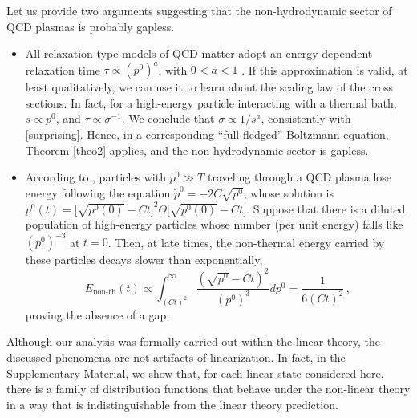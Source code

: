 \documentclass[a4paper, amsfonts, amssymb, amsmath, reprint, showkeys, nofootinbib, twoside, onecolumn,notitlepage,,longbibliography]{revtex4-2}
\theoremstyle{definition}
\theoremstyle{theorem}
\theoremstyle{corollary}
\begin{document}
Let us provide two arguments suggesting that the non-hydrodynamic sector of QCD plasmas is probably gapless.
\begin{itemize}
\item All relaxation-type models of QCD matter adopt an energy-dependent relaxation time $\tau \propto (p^0)^a$, with $0<a< 1$ \cite{Dusling:2009df,Kurkela:2017xis,Rocha:2021zcw}. If this approximation is valid, at least qualitatively, we can use it to learn about the scaling law of the cross sections. In fact, for a high-energy particle interacting with a thermal bath, $s \propto p^0$, and $\tau \propto \sigma^{-1}$. We conclude that $\sigma \propto 1/s^a$, consistently with \eqref{surprising}. Hence, in a corresponding ``full-fledged'' Boltzmann equation, Theorem \ref{theo2} applies, and the non-hydrodynamic sector is gapless. 
\item According to \cite{Baier:1996kr,Baier:1996sk}, particles with $p^0 \gg T$ traveling through a QCD plasma lose energy following the equation $\dot{p}^0=-2C\sqrt{p^0}$, whose solution is $p^0(t)=\big[\sqrt{p^0(0)}{-}Ct \big]^2\Theta[\sqrt{p^0(0)}{-}Ct \big]$. Suppose that there is a diluted population of high-energy particles whose number (per unit energy) falls like $(p^0)^{-3}$ at $t=0$. Then, at late times, the non-thermal energy carried by these particles decays slower than exponentially,
\begin{equation}
E_{\text{non-th}}(t) \propto \int_{(Ct)^2}^{\infty} \dfrac{(\sqrt{p^0}-Ct)^2}{(p^0)^3} dp^0 = \dfrac{1}{6(Ct)^2} \, ,
\end{equation}
proving the absence of a gap.
\end{itemize}

Although our analysis was formally carried out within the linear theory, the discussed phenomena are not artifacts of linearization. In fact, in the Supplementary Material, we show that, for each linear state considered here, there is a family of distribution functions that behave under the non-linear theory in a way that is indistinguishable from the linear theory prediction.






\end{document}
